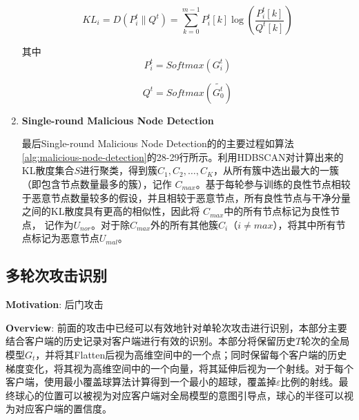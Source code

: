 \documentclass[lettersize,journal]{IEEEtran}
\begin{document}
\begin{enumerate}
\begin{equation}
{{KL}}_i = D(P_i^t \| Q^t) = \sum_{k=0}^{m-1} P_i^t[k] \log \left( \frac{P_i^t[k]}{Q^t[k]} \right)
\label{equation:KL}
\end{equation}

其中
\[
P_i^t = Softmax(G_i^t)
\]

\[
Q^t = Softmax(\tilde{G_0^t})
\]


\item \textbf{Single-round Malicious Node Detection}

最后Single-round Malicious Node Detection的的主要过程如算法\ref{alg:malicious-node-detection}的28-29行所示。利用HDBSCAN对计算出来的KL散度集合$S$进行聚类，得到簇\(C_1, C_2, \ldots, C_K\)，从所有簇中选出最大的一簇（即包含节点数量最多的簇），记作 \(C_{max}\)。基于每轮参与训练的良性节点相较于恶意节点数量较多的假设，并且相较于恶意节点，所有良性节点与干净分量之间的KL散度具有更高的相似性，因此将 \(C_{max}\)中的所有节点标记为良性节点， 记作为\(U_{nor}\)。对于除\(C_{max}\)外的所有其他簇\(C_i\)（\(i \neq {max}\)），将其中所有节点标记为恶意节点\(U_{mal}\)。 

\end{enumerate}

\subsection{多轮次攻击识别}

\textbf{Motivation}: 后门攻击

\textbf{Overview}: 前面的攻击中已经可以有效地针对单轮次攻击进行识别，本部分主要结合客户端的历史记录对客户端进行有效的识别。本部分将保留历史$T$轮次的全局模型$G_t$，并将其Flatten后视为高维空间中的一个点；同时保留每个客户端的历史梯度变化，将其视为高维空间中的一个向量，将其延伸后视为一个射线。对于每个客户端，使用最小覆盖球算法计算得到一个最小的超球，覆盖掉$\varepsilon$比例的射线。最终球心的位置可以被视为对应客户端对全局模型的意图引导点，球心的半径可以视为对应客户端的置信度。
\end{document}
